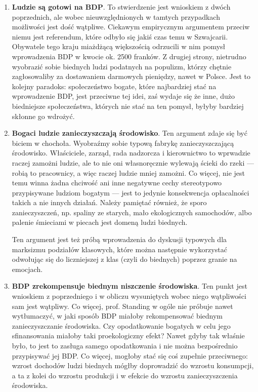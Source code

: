 \documentclass[11pt]{article}
\begin{document}
\begin{enumerate}
		\item \textbf{Ludzie są gotowi na BDP}. To stwierdzenie jest wnioskiem z dwóch poprzednich, ale wobec nieuwzględnionych w tamtych przypadkach możliwości jest dość wątpliwe. Ciekawym empirycznym argumentem przeciw niemu jest referendum, które odbyło się jakiś czas temu w Szwajcarii. Obywatele tego kraju miażdżącą większością odrzucili w nim pomysł wprowadzenia BDP w kwocie ok. 2500 franków. Z drugiej strony, nietrudno wyobrazić sobie biednych ludzi podatnych na populizm, którzy chętnie zagłosowaliby za dostawaniem darmowych pieniędzy, nawet w Polsce. Jest to kolejny paradoks: społeczeństwo bogate, które najbardziej stać na wprowadzenie BDP, jest przeciwne tej idei, zaś wydaje się że inne, dużo biedniejsze społeczeństwa, których nie stać na ten pomysł, byłyby bardziej skłonne go wdrożyć.
		\item \textbf{Bogaci ludzie zanieczyszczają środowisko}. Ten argument zdaje się być biciem w chochoła. Wyobraźmy sobie typową fabrykę zanieczyszczającą środowisko. Właściciele, zarząd, rada nadzorcza i kierownictwo to wprwadzie raczej zamożni ludzie, ale to nie oni własnoręcznie wylewają ścieki do rzeki — robią to pracownicy, a więc raczej ludzie mniej zamożni. Co więcej, nie jest temu winna żadna chciwość ani inne negatywne cechy stereotypowo przypisywane ludziom bogatym — jest to jedynie konsekwencja opłacalności takich a nie innych działań. Należy pamiętać również, że sporo zanieczyszczeń, np. spaliny ze starych, mało ekologicznych samochodów, albo palenie śmieciami w piecach jest domeną ludzi biednych.
		\par Ten argument jest też próbą wprowadzenia do dyskusji typowych dla marksizmu podziałów klasowych, które można następnie wykorzystać odwołując się do liczniejszej z klas (czyli do biednych) poprzez granie na emocjach.
		\item \textbf{BDP zrekompensuje biednym niszczenie środowiska}. Ten punkt jest wnioskiem z poprzedniego i w obliczu wysuniętych wobec niego wątpliwości sam jest wątpliwy. Co więcej, prof. Standing w ogóle nie próbuje nawet wytłumaczyć, w jaki sposób BDP miałoby rekompensować biednym zanieczyszczanie środowiska. Czy opodatkowanie bogatych w celu jego sfinansowania miałoby taki proekologiczny efekt? Nawet gdyby tak właśnie było, to jest to zasługa samego opodatkowania i nie można bezpośrednio przypisywać jej BDP. Co więcej, mogłoby stać się coś zupełnie przeciwnego: wzrost dochodów ludzi biednych mógłby doprowadzić do wzrostu konsumpcji, a ta z kolei do wzrostu produkcji i w efekcie do wzrostu zanieczyszczenia środowiska.

\end{enumerate}
\end{document}

